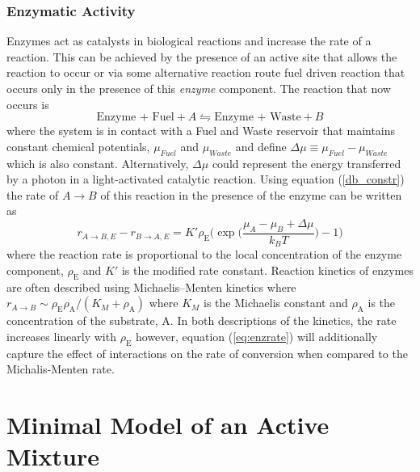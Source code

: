 \subsubsection{Enzymatic Activity}
Enzymes act as catalysts in biological reactions and increase the rate of a reaction. This can be achieved by the presence of an active site that allows the reaction to occur or via some alternative reaction route    fuel driven reaction that occurs only in the presence of this \textit{enzyme} component. The reaction that now occurs is
\begin{equation}
    \text{Enzyme + Fuel} + A \leftrightharpoons \text{Enzyme + Waste} + B
\end{equation}
where the system is in contact with a Fuel and Waste reservoir that maintains constant chemical potentials, $\mu_{Fuel}$ and $\mu_{Waste}$ and define $\Delta\mu \equiv \mu_{Fuel}-\mu_{Waste}$ which is also constant. Alternatively, $\Delta \mu$ could represent the energy transferred by a photon in a light-activated catalytic reaction. Using equation (\ref{db_constr}) the rate of $A \rightarrow B$ of this reaction in the presence of the enzyme can be written as
\begin{equation}
    r_{A \rightarrow B,E} - r_{B \rightarrow A,E} = K'\rho_\textrm{E}\Bigg(\exp\bigg(\frac{\mu_A - \mu_B + \Delta\mu}{k_B T}\bigg)-1\Bigg)
    \label{eq:enzrate}
\end{equation}
where the reaction rate is proportional to the local concentration of the enzyme component, $\rho_\textrm{E}$ and $K'$ is the modified rate constant. Reaction kinetics of enzymes are often described using Michaelis–Menten kinetics where $r_{A\rightarrow B}\sim\rho_\textrm{E}\rho_\textrm{A}/(K_{M}+\rho_\textrm{A})$ where $K_M$ is the Michaelis constant and $\rho_\textrm{A}$ is the concentration of the substrate, A\cite{murray_mathematical_1993}. In both  descriptions of the kinetics, the rate increases linearly with $\rho_\textrm{E}$ however, equation (\ref{eq:enzrate}) will additionally capture the effect of interactions on the rate of conversion when compared to the Michalis-Menten rate.

\section{Minimal Model of an Active Mixture}

